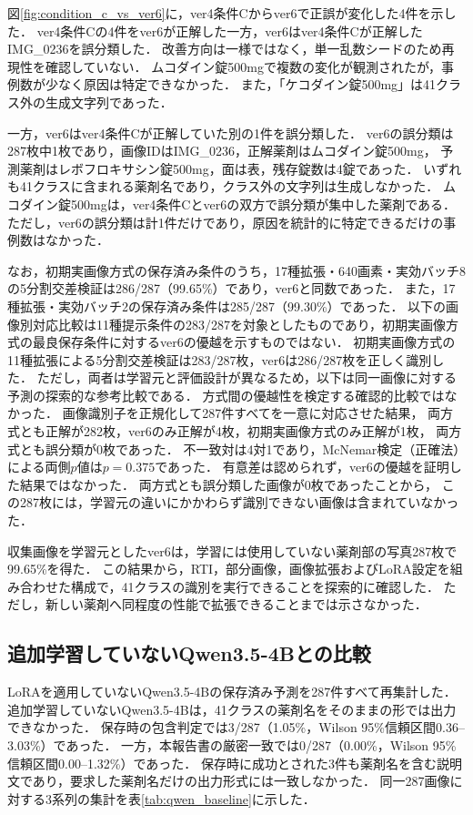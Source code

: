 \documentclass[uplatex,dvipdfmx]{jsarticle}
\begin{document}
図\ref{fig:condition_c_vs_ver6}に，ver4条件Cからver6で正誤が変化した4件を示した．
ver4条件Cの4件をver6が正解した一方，ver6はver4条件Cが正解したIMG\_0236を誤分類した．
改善方向は一様ではなく，単一乱数シードのため再現性を確認していない．
ムコダイン錠500mgで複数の変化が観測されたが，事例数が少なく原因は特定できなかった．
また，「ケコダイン錠500mg」は41クラス外の生成文字列であった．

一方，ver6はver4条件Cが正解していた別の1件を誤分類した．
ver6の誤分類は287枚中1枚であり，画像IDはIMG\_0236，正解薬剤はムコダイン錠500mg，
予測薬剤はレボフロキサシン錠500mg，面は表，残存錠数は4錠であった．
いずれも41クラスに含まれる薬剤名であり，クラス外の文字列は生成しなかった．
ムコダイン錠500mgは，ver4条件Cとver6の双方で誤分類が集中した薬剤である．
ただし，ver6の誤分類は計1件だけであり，原因を統計的に特定できるだけの事例数はなかった．

なお，初期実画像方式の保存済み条件のうち，17種拡張・640画素・実効バッチ8の5分割交差検証は286/287（99.65\%）であり，ver6と同数であった．
また，17種拡張・実効バッチ2の保存済み条件は285/287（99.30\%）であった．
以下の画像別対応比較は11種提示条件の283/287を対象としたものであり，初期実画像方式の最良保存条件に対するver6の優越を示すものではない．
初期実画像方式の11種拡張による5分割交差検証は283/287枚，ver6は286/287枚を正しく識別した．
ただし，両者は学習元と評価設計が異なるため，以下は同一画像に対する予測の探索的な参考比較である．
方式間の優越性を検定する確認的比較ではなかった．
画像識別子を正規化して287件すべてを一意に対応させた結果，
両方式とも正解が282枚，ver6のみ正解が4枚，初期実画像方式のみ正解が1枚，
両方式とも誤分類が0枚であった．
不一致対は4対1であり，McNemar検定（正確法）による両側$p$値は$p=0.375$であった．
有意差は認められず，ver6の優越を証明した結果ではなかった．
両方式とも誤分類した画像が0枚であったことから，
この287枚には，学習元の違いにかかわらず識別できない画像は含まれていなかった．

収集画像を学習元としたver6は，学習には使用していない薬剤部の写真287枚で99.65\%を得た．
この結果から，RTI，部分画像，画像拡張およびLoRA設定を組み合わせた構成で，41クラスの識別を実行できることを探索的に確認した．
ただし，新しい薬剤へ同程度の性能で拡張できることまでは示さなかった．

\subsection{追加学習していないQwen3.5-4Bとの比較}\label{sec:qwen_baseline}

LoRAを適用していないQwen3.5-4Bの保存済み予測を287件すべて再集計した．
追加学習していないQwen3.5-4Bは，41クラスの薬剤名をそのままの形では出力できなかった．
保存時の包含判定では3/287（1.05\%，Wilson 95\%信頼区間0.36--3.03\%）であった．
一方，本報告書の厳密一致では0/287（0.00\%，Wilson 95\%信頼区間0.00--1.32\%）であった．
保存時に成功とされた3件も薬剤名を含む説明文であり，要求した薬剤名だけの出力形式には一致しなかった．
同一287画像に対する3系列の集計を表\ref{tab:qwen_baseline}に示した．
\end{document}
